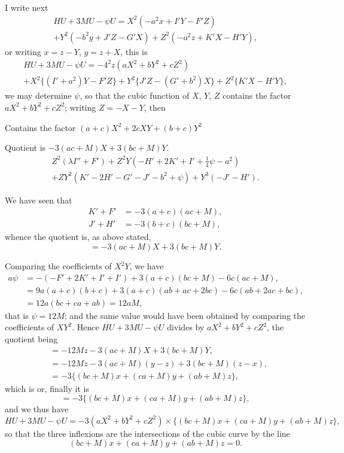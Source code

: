 \documentclass[11pt,a4paper]{article}
\theoremstyle{definition}
\begin{document}
I write next
\begin{multline*}
HU + 3MU - \psi U = X^2(-a^2x + I'Y - F'Z) \\
+ Y^2(-b^2y + J'Z - G'X) + Z^2(-a^2z + K'X - H'Y),
\end{multline*}
or writing $x = z - Y$, $y = z + X$, this is
\begin{multline*}
HU + 3MU - \psi U = -4^2z(aX^2 + bY^2 + cZ^2) \\
+ X^2\{(I'+a^2)Y - F'Z\} + Y^2\{J'Z - (G'+b^2)X\} + Z^2\{K'X - H'Y\},
\end{multline*}
we may determine $\psi$, so that the cubic function of $X$, $Y$, $Z$ contains the factor $aX^2 + bY^2 + cZ^2$; writing $Z = -X-Y$, then

Contains the factor $(a+c)X^2 + 2cXY + (b+c)Y^2$

Quotient is $-3(ac+M)X + 3(bc+M)Y$.
\begin{multline*}
Z^2(\lambda I'' + F') + Z^2Y(-H' + 2K' + I' + \tfrac{1}{4}\psi - a^2) \\
+ ZY^2(K' - 2H' - G' - J' - b^2 + \psi) + Y^3(-J' - H').
\end{multline*}

We have seen that
\begin{align*}
K' + F' &= -3(a+c)(ac+M),\\
J' + H' &= -3(b+c)(bc+M),
\end{align*}
whence the quotient is, as above stated,
\[
= -3(ac+M)X + 3(bc+M)Y.
\]

Comparing the coefficients of $X^2Y$, we have
\begin{align*}
a\psi &= -(-F' + 2K' + I' + I') + 3(a+c)(bc+M) - 6c(ac+M),\\
&= 9a(a+c)(b+c) + 3(a+c)(ab+ac+2bc) - 6c(ab+2ac+bc),\\
&= 12a(bc+ca+ab) = 12aM,
\end{align*}
that is $\psi = 12M$; and the same value would have been obtained by comparing the coefficients of $XY^2$. Hence $HU + 3MU - \psi U$ divides by $aX^2 + bY^2 + cZ^2$, the quotient being
\begin{align*}
&= -12Mz - 3(ac+M)X + 3(bc+M)Y,\\
&= -12Mz - 3(ac+M)(y-z) + 3(bc+M)(z-x),\\
&= -3\{(bc+M)x + (ca+M)y + (ab+M)z\},
\end{align*}
which is or, finally it is
\[
= -3\{(bc+M)x + (ca+M)y + (ab+M)z\},
\]
and we thus have
\[
HU + 3MU - \psi U = -3(aX^2 + bY^2 + cZ^2) \times \{(bc+M)x + (ca+M)y + (ab+M)z\},
\]
so that the three inflexions are the intersections of the cubic curve by the line
\[
(bc+M)x + (ca+M)y + (ab+M)z = 0.
\]
\end{document}
